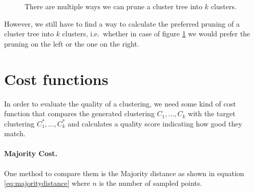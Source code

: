 \begin{figure}[h]
\centering
\begin{minipage}{.45\textwidth}
  \centering
{}
\end{minipage}
\begin{minipage}{.45\textwidth}
  \centering
{}
\end{minipage}
\caption{There are multiple ways we can prune a cluster tree into $k$ clusters.}
\label{fig:pruning}
\end{figure}

However, we still have to find a way to calculate the preferred pruning of a cluster tree into $k$ clusters, i.e.\ whether in case of figure \ref{fig:pruning} we would prefer the pruning on the left or the one on the right.

\section{Cost functions}
\label{chapter:costfunctions}

In order to evaluate the quality of a clustering, we need some kind of cost function that compares the generated clustering $C_1,...,C_k$ with the target clustering $C_1^*, ..., C_k^*$ and calculates a quality score indicating how good they match. 

\paragraph{Majority Cost.} One method to compare them is the Majority distance as shown in equation \ref{eq:majoritydistance} where $n$ is the number of sampled points.


